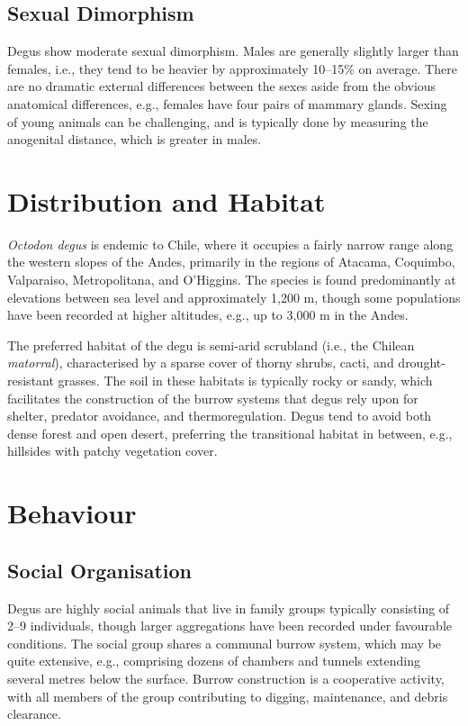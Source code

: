 \documentclass[12pt,a4paper]{article}
\begin{document}
\subsection{Sexual Dimorphism}

Degus show moderate sexual dimorphism.
Males are generally slightly larger than females, i.e., they tend to be heavier by approximately 10--15\% on average.
There are no dramatic external differences between the sexes aside from the obvious anatomical differences, e.g., females have four pairs of mammary glands.
Sexing of young animals can be challenging, and is typically done by measuring the anogenital distance, which is greater in males.

\section{Distribution and Habitat}

\textit{Octodon degus} is endemic to Chile, where it occupies a fairly narrow range along the western slopes of the Andes, primarily in the regions of Atacama, Coquimbo, Valparaiso, Metropolitana, and O'Higgins.
The species is found predominantly at elevations between sea level and approximately 1,200 m, though some populations have been recorded at higher altitudes, e.g., up to 3,000 m in the Andes.

The preferred habitat of the degu is semi-arid scrubland (i.e., the Chilean \textit{matorral}), characterised by a sparse cover of thorny shrubs, cacti, and drought-resistant grasses.
The soil in these habitats is typically rocky or sandy, which facilitates the construction of the burrow systems that degus rely upon for shelter, predator avoidance, and thermoregulation.
Degus tend to avoid both dense forest and open desert, preferring the transitional habitat in between, e.g., hillsides with patchy vegetation cover.

\section{Behaviour}

\subsection{Social Organisation}

Degus are highly social animals that live in family groups typically consisting of 2--9 individuals, though larger aggregations have been recorded under favourable conditions.
The social group shares a communal burrow system, which may be quite extensive, e.g., comprising dozens of chambers and tunnels extending several metres below the surface.
Burrow construction is a cooperative activity, with all members of the group contributing to digging, maintenance, and debris clearance.
\end{document}
